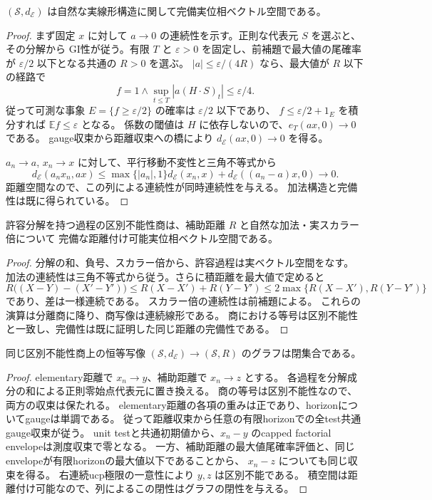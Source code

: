 \begin{proposition}[elementary距離のスカラー同時連続性]
$(\mathcal S,d_{\mathcal E})$ は自然な実線形構造に関して完備実位相ベクトル空間である。
\end{proposition}
\begin{proof}
まず固定 $x$ に対して $a\to0$ の連続性を示す。正則な代表元 $S$ を選ぶと、その分解から
GI性が従う。有限 $T$ と $\varepsilon>0$ を固定し、前補題で最大値の尾確率が
$\varepsilon/2$ 以下となる共通の $R>0$ を選ぶ。
$|a|\le\varepsilon/(4R)$ なら、最大値が $R$ 以下の経路で
\[
 f=1\wedge\sup_{t\le T}|a(H\cdot S)_t|\le\varepsilon/4.
\]
従って可測な事象 $E=\{f\ge\varepsilon/2\}$ の確率は $\varepsilon/2$ 以下であり、
$f\le\varepsilon/2+1_E$ を積分すれば $\mathbb E f\le\varepsilon$ となる。
係数の閾値は $H$ に依存しないので、$e_T(ax,0)\to0$ である。
gauge収束から距離収束への橋により $d_{\mathcal E}(ax,0)\to0$ を得る。

$a_n\to a$, $x_n\to x$ に対して、平行移動不変性と三角不等式から
\[
 d_{\mathcal E}(a_nx_n,ax)
 \le\max\{|a_n|,1\}d_{\mathcal E}(x_n,x)
   +d_{\mathcal E}((a_n-a)x,0)\longrightarrow0.
\]
距離空間なので、この列による連続性が同時連続性を与える。
加法構造と完備性は既に得られている。
\end{proof}

\begin{proposition}[補助距離に関する完備実位相ベクトル空間]
許容分解を持つ過程の区別不能性商は、補助距離 $R$ と自然な加法・実スカラー倍について
完備な距離付け可能実位相ベクトル空間である。
\end{proposition}
\begin{proof}
分解の和、負号、スカラー倍から、許容過程は実ベクトル空間をなす。
加法の連続性は三角不等式から従う。さらに積距離を最大値で定めると
\[
 R\bigl((X-Y)-(X'-Y')\bigr)
 \le R(X-X')+R(Y-Y')
 \le2\max\{R(X-X'),R(Y-Y')\}
\]
であり、差は一様連続である。
スカラー倍の連続性は前補題による。
これらの演算は分離商に降り、商写像は連続線形である。
商における等号は区別不能性と一致し、完備性は既に証明した同じ距離の完備性である。
\end{proof}

\begin{proposition}[二つの位相の間の閉グラフ]
同じ区別不能性商上の恒等写像
$(\mathcal S,d_{\mathcal E})\to(\mathcal S,R)$ のグラフは閉集合である。
\end{proposition}
\begin{proof}
elementary距離で $x_n\to y$、補助距離で $x_n\to z$ とする。
各過程を分解成分の和による正則零始点代表元に置き換える。
商の等号は区別不能性なので、両方の収束は保たれる。
elementary距離の各項の重みは正であり、horizonについてgaugeは単調である。
従って距離収束から任意の有限horizonでの全test共通gauge収束が従う。
unit testと共通初期値から、$x_n-y$ のcapped factorial envelopeは測度収束で零となる。
一方、補助距離の最大値尾確率評価と、同じenvelopeが有限horizonの最大値以下であることから、
$x_n-z$ についても同じ収束を得る。
右連続ucp極限の一意性により $y,z$ は区別不能である。
積空間は距離付け可能なので、列によるこの閉性はグラフの閉性を与える。
\end{proof}

